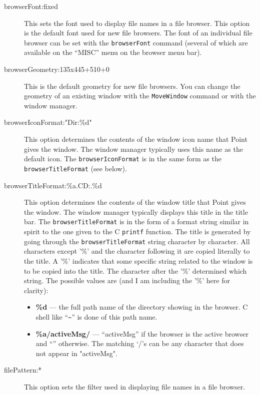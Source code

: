 \begin{description}

\item[browserFont:fixed]
This sets the font used to display file names in a file browser.
This option is the default font used for new file browsers.
The font of an individual file browser can be set with the
{\tt browserFont} command (several of which are available
on the ``MISC'' menu on the browser menu bar).

\item[browserGeometry:135x445+510+0]
This is the default geometry for new file browsers.
You can change the geometry of an existing window
with the {\tt MoveWindow} command or with the window manager.

\item[browserIconFormat:"Dir:\%d"]
This option determines the contents of the window icon name that
Point gives the window.
The window manager typically uses this name as the default icon.
The {\tt browserIconFormat} is in the same form as the
{\tt browserTitleFormat} (see below).

\item[browserTitleFormat:\%a.CD:.\%d]
This option determines the contents of the window title that
Point gives the window.
The window manager typically displays this title in the title bar.
The {\tt browserTitleFormat} is in the form of a format string similar
in spirit to the one given to the C {\tt printf} function.
The title is generated by going through the {\tt browserTitleFormat} string
character by character.
All characters except '\%' and the character following it
are copied literally to the title.
A '\%' indicates that some specific string related to the window
is to be copied into the title.
The character after the '\%' determined which string.
The possible values are (and I am including the '\%' here for clarity):
\begin{itemize}
\item {\bf \%d} --- the full path name of the directory showing in the
	browser.  C shell like ``\verb+~+'' is done of this path name.
\item {\bf \%a/activeMsg/} --- ``activeMsg'' if the browser is the active
		browser and ``'' otherwise.
		The matching `/'s can be any character that does not
		appear in "activeMsg".
\end{itemize}

\item[filePattern:*]
This option sets the filter used in displaying file names
in a file browser.


\end{description}
